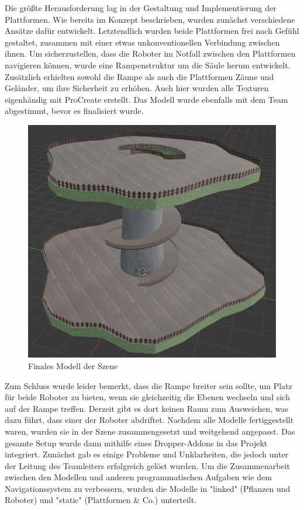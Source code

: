 \par
Die größte Herausforderung lag in der Gestaltung und Implementierung der Plattformen. Wie bereits im Konzept beschrieben, wurden zunächst verschiedene Ansätze dafür entwickelt. Letztendlich wurden beide Plattformen frei nach Gefühl gestaltet, zusammen mit einer etwas unkonventionellen Verbindung zwischen ihnen. Um sicherzustellen, dass die Roboter im Notfall zwischen den Plattformen navigieren können, wurde eine Rampenstruktur um die Säule herum entwickelt. Zusätzlich erhielten sowohl die Rampe als auch die Plattformen Zäune und Geländer, um ihre Sicherheit zu erhöhen. Auch hier wurden alle Texturen eigenhändig mit ProCreate erstellt. Das Modell wurde ebenfalls mit dem Team abgestimmt, bevor es finalisiert wurde.
\begin{figure}[H]
	\centering
	\includegraphics[height=0.3\pageheight,keepaspectratio]{pics/13}
	\caption{Finales Modell der Szene}
\end{figure}
\par
Zum Schluss wurde leider bemerkt, dass die Rampe breiter sein sollte, um Platz für beide Roboter zu bieten, wenn sie gleichzeitig die Ebenen wechseln und sich auf der Rampe treffen. Derzeit gibt es dort keinen Raum zum Ausweichen, was dazu führt, dass einer der Roboter abdriftet.
Nachdem alle Modelle fertiggestellt waren, wurden sie in der Szene zusammengesetzt und weitgehend angepasst. Das gesamte Setup wurde dann mithilfe eines Dropper-Addons in das Projekt integriert. Zunächst gab es einige Probleme und Unklarheiten, die jedoch unter der Leitung des Teamleiters erfolgreich gelöst wurden. Um die Zusammenarbeit zwischen den Modellen und anderen programmatischen Aufgaben wie dem Navigationssystem zu verbessern, wurden die Modelle in "linked" (Pflanzen und Roboter) und "static" (Plattformen & Co.) unterteilt.
